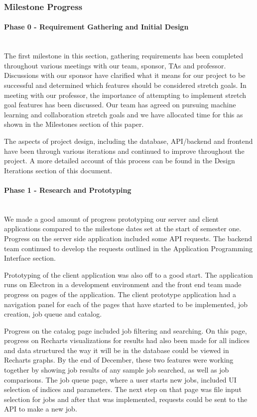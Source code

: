 \subsubsection{Milestone Progress}
\paragraph{Phase 0 - Requirement Gathering and Initial Design} \mbox{}\\[\paragraphheaderspace]
The first milestone in this section, gathering requirements has been completed throughout various meetings with our team, sponsor, TAs and professor. Discussions with our sponsor have clarified what it means for our project to be successful and determined which features should be considered stretch goals. In meeting with our professor, the importance of attempting to implement stretch goal features has been discussed. Our team has agreed on pursuing machine learning  and collaboration stretch goals and we have allocated time for this as shown in the Milestones section of this paper.\par
The aspects of project design, including the database, API/backend and frontend have been through various iterations and continued to improve throughout the project. A more detailed account of this process can be found in the Design Iterations section of this document.\par
\paragraph{Phase 1 - Research and Prototyping} \mbox{}\\[\paragraphheaderspace]
We made a good amount of progress prototyping our server and client applications compared to the milestone dates set at the start of semester one. Progress on the server side application included some API requests. The backend team continued to develop the requests outlined in the Application Programming Interface section.\par
Prototyping of the client application was also off to a good start. The application runs on Electron in a development environment and the front end team made progress on pages of the application. The client prototype application had a navigation panel for each of the pages that have started to be implemented, job creation, job queue and catalog.\par
Progress on the catalog page included job filtering and searching. On this page, progress on Recharts visualizations for results had also been made for all indices and data structured the way it will be in the database could be viewed in Recharts graphs. By the end of December, these two features were working together by showing job results of any sample job searched, as well as job comparisons. The job queue page, where a user starts new jobs, included UI selection of indices and parameters. The next step on that page was file input selection for jobs and after that was implemented, requests could be sent to the API to make a new job.\par

